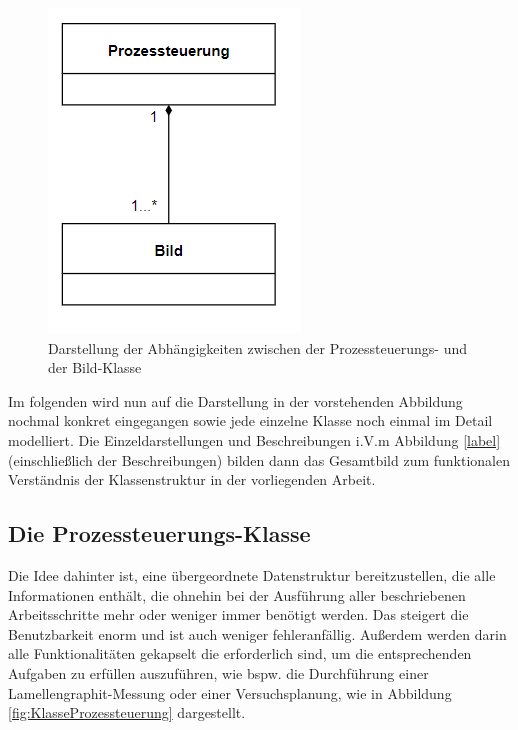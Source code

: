\documentclass[
fontsize=10pt, 
listof = totoc,
parskip = half	
]{report}
\begin{document}
\begin{figure}[H]
	\centering
	\includegraphics[scale=0.6]{pics/class_diagram_overview}
	\caption{Darstellung der Abhängigkeiten zwischen der Prozessteuerungs- und der Bild-Klasse}
	\label{fig:KlassendiagrammUeberblick}
\end{figure}

Im folgenden wird nun auf die Darstellung in der vorstehenden Abbildung nochmal konkret eingegangen sowie jede einzelne Klasse noch einmal im Detail modelliert. Die Einzeldarstellungen und Beschreibungen i.V.m Abbildung \ref{label} (einschließlich der Beschreibungen) bilden dann das Gesamtbild zum funktionalen Verständnis der Klassenstruktur in der vorliegenden Arbeit.


\subsection{Die Prozessteuerungs-Klasse}

Die Idee dahinter ist, eine übergeordnete Datenstruktur bereitzustellen, die alle Informationen enthält, die ohnehin bei der Ausführung aller beschriebenen Arbeitsschritte mehr oder weniger immer benötigt werden. Das steigert die Benutzbarkeit enorm und ist auch weniger fehleranfällig. Außerdem werden darin alle Funktionalitäten gekapselt die erforderlich sind, um die entsprechenden Aufgaben zu erfüllen auszuführen, wie bspw. die Durchführung einer Lamellengraphit-Messung oder einer Versuchsplanung, wie in Abbildung \ref{fig:KlasseProzessteuerung} dargestellt.
\end{document}
